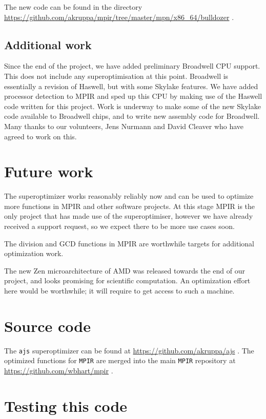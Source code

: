 The new code can be found in the directory
\url{https://github.com/akruppa/mpir/tree/master/mpn/x86_64/bulldozer} .

\subsection{Additional work}\label{additional-work}

Since the end of the project, we have added preliminary Broadwell CPU
support. This does not include any superoptimisation at this point.
Broadwell is essentially a revision of Haswell, but with some Skylake
features. We have added processor detection to MPIR and sped up this CPU
by making use of the Haswell code written for this project. Work is
underway to make some of the new Skylake code available to Broadwell
chips, and to write new assembly code for Broadwell. Many thanks to our
volunteers, Jens Nurmann and David Cleaver who have agreed to work on
this.

\section{Future work}\label{future-work}

The superoptimizer works reasonably reliably now and can be used to
optimize more functions in MPIR and other software projects. At this
stage MPIR is the only project that has made use of the superoptimiser,
however we have already received a support request, so we expect there
to be more use cases soon.

The division and GCD functions in MPIR are worthwhile targets for
additional optimization work.

The new Zen microarchitecture of AMD was released towards the end of our
project, and looks promising for scientific computation. An optimization
effort here would be worthwhile; it will require to get access to such a
machine.

\section{Source code}\label{source-code}

The \texttt{ajs} superoptimizer can be found at
\url{https://github.com/akruppa/ajs} . The optimized functions for
\texttt{MPIR} are merged into the main \texttt{MPIR} repository at
\url{https://github.com/wbhart/mpir} .

\section{Testing this code}\label{testing-this-code}

